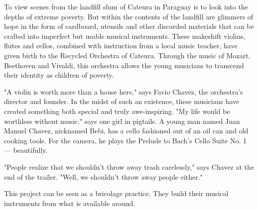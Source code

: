 \begin{itemize}
To view scenes from the landfill slum of Cateura in Paraguay is to look into the depths of extreme poverty. But within the contents of the landfill are glimmers of hope in the form of cardboard, utensils and other discarded materials that can be crafted into imperfect but usable musical instruments. These makeshift violins, flutes and cellos, combined with instruction from a local music teacher, have given birth to the Recycled Orchestra of Cateura. Through the music of Mozart, Beethoven and Vivaldi, this orchestra allows the young musicians to transcend their identity as children of poverty.

"A violin is worth more than a house here," says Favio Chavez, the orchestra's director and founder. In the midst of such an existence, these musicians have created something both special and truly awe-inspiring. "My life would be worthless without music." says one girl in pigtails. A young man named Juan Manuel Chavez, nicknamed Bebi, has a cello fashioned out of an oil can and old cooking tools. For the camera, he plays the Prelude to Bach's Cello Suite No. 1 — beautifully.

"People realize that we shouldn't throw away trash carelessly," says Chavez at the end of the trailer. "Well, we shouldn't throw away people either."

This project can be seen as a bricolage practice. They build their musical instruments from what is available around. 


\end{itemize}
